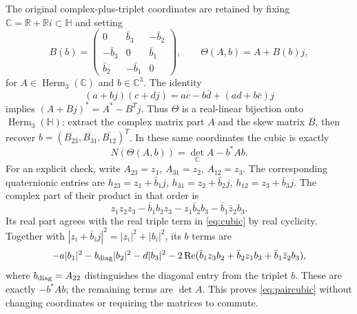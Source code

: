 \documentclass[11pt,a4paper]{article}
\numberwithin{equation}{section}
\theoremstyle{definition}
\theoremstyle{remark}
\newcommand{\HH}{\mathbb H}
\newcommand{\RR}{\mathbb R}
\newcommand{\Herm}{\operatorname{Herm}}
\newcommand{\Rea}{\operatorname{Re}}
\begin{document}
The original complex-plus-triplet coordinates are retained by fixing
$\mathbb C=\RR+\RR i\subset\HH$ and setting
\begin{equation}\label{eq:theta}
B(b)=\begin{pmatrix}0&\bar b_3&-\bar b_2\\-\bar b_3&0&\bar b_1\\
\bar b_2&-\bar b_1&0\end{pmatrix},\qquad
\Theta(A,b)=A+B(b)j,
\end{equation}
for $A\in\Herm_3(\mathbb C)$ and $b\in\mathbb C^3$.
The identity
\[
(a+bj)(c+dj)=ac-b\bar d+(ad+b\bar c)j
\]
implies $(A+Bj)^*=A^*-B^Tj$. Thus $\Theta$ is a real-linear
bijection onto $\Herm_3(\HH)$: extract the complex matrix part $A$
and the skew matrix $B$, then recover
$b=(\overline{B_{23}},\overline{B_{31}},\overline{B_{12}})^T$.
In these same coordinates the cubic is exactly
\begin{equation}\label{eq:paircubic}
N(\Theta(A,b))=\det_{\mathbb C}A-b^*Ab.
\end{equation}
For an explicit check, write $A_{23}=z_1$, $A_{31}=z_2$,
$A_{12}=z_3$. The corresponding quaternionic entries are
$h_{23}=z_1+\bar b_1j$, $h_{31}=z_2+\bar b_2j$,
$h_{12}=z_3+\bar b_3j$. The complex part of their product in that order is
\[
z_1z_2z_3-\bar b_1b_2z_3-z_1\bar b_2b_3-\bar b_1\bar z_2b_3.
\]
Its real part agrees with the real triple term in \eqref{eq:cubic}
by real cyclicity. Together with
$|z_i+\bar b_ij|^2=|z_i|^2+|b_i|^2$, its $b$ terms are
\[
-a|b_1|^2-b_{\rm diag}|b_2|^2-d|b_3|^2
-2\Rea(\bar b_1z_3b_2+\bar b_2z_1b_3+\bar b_1\bar z_2b_3),
\]
where $b_{\rm diag}=A_{22}$ distinguishes the diagonal entry from the
triplet $b$. These are exactly $-b^*Ab$; the remaining terms are
$\det A$. This proves \eqref{eq:paircubic} without changing coordinates
or requiring the matrices to commute.
\end{document}
